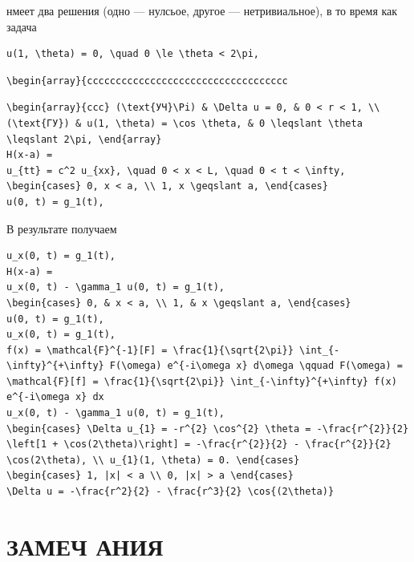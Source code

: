 \documentclass[
  ukrainian,
]{article}
\begin{document}
нмеет два решения (одно --- нулсьое, другое --- нетривиальное), в то
время как задача

\begin{verbatim}
u(1, \theta) = 0, \quad 0 \le \theta < 2\pi,
\end{verbatim}

\begin{verbatim}
\begin{array}{ccccccccccccccccccccccccccccccccccc
\end{verbatim}

\begin{verbatim}
\begin{array}{ccc} (\text{УЧ}\Pi) & \Delta u = 0, & 0 < r < 1, \\ (\text{ГУ}) & u(1, \theta) = \cos \theta, & 0 \leqslant \theta \leqslant 2\pi, \end{array}
H(x-a) =
u_{tt} = c^2 u_{xx}, \quad 0 < x < L, \quad 0 < t < \infty,
\begin{cases} 0, x < a, \\ 1, x \geqslant a, \end{cases}
u(0, t) = g_1(t),
\end{verbatim}

В результате получаем

\begin{verbatim}
u_x(0, t) = g_1(t),
H(x-a) =
u_x(0, t) - \gamma_1 u(0, t) = g_1(t),
\begin{cases} 0, & x < a, \\ 1, & x \geqslant a, \end{cases}
u(0, t) = g_1(t),
u_x(0, t) = g_1(t),
f(x) = \mathcal{F}^{-1}[F] = \frac{1}{\sqrt{2\pi}} \int_{-\infty}^{+\infty} F(\omega) e^{-i\omega x} d\omega \qquad F(\omega) = \mathcal{F}[f] = \frac{1}{\sqrt{2\pi}} \int_{-\infty}^{+\infty} f(x) e^{-i\omega x} dx
u_x(0, t) - \gamma_1 u(0, t) = g_1(t),
\begin{cases} \Delta u_{1} = -r^{2} \cos^{2} \theta = -\frac{r^{2}}{2} \left[1 + \cos(2\theta)\right] = -\frac{r^{2}}{2} - \frac{r^{2}}{2} \cos(2\theta), \\ u_{1}(1, \theta) = 0. \end{cases}
\begin{cases} 1, |x| < a \\ 0, |x| > a \end{cases}
\Delta u = -\frac{r^2}{2} - \frac{r^3}{2} \cos{(2\theta)}
\end{verbatim}

\section{ЗАМЕЧ
АНИЯ}\label{ux437ux430ux43cux435ux447-ux430ux43dux438ux44f}
\end{document}
